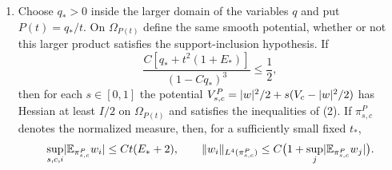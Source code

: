 \begin{theorem}
\begin{enumerate}
\[
 \Var_kF\le2\E_k\abs{\nabla F}^2,\qquad \Ent_k(F^2)\le4\E_k\abs{\nabla F}^2,
\]
and for real or complex $F,G$, with the covariance taken bilinear,
\[
 \abs{\Cov_k(F,G)}\le C\sum_{i,j}e^{-b'\dist(i,j)}\norm{\partial_iF}_2\norm{\partial_jG}_2
\]
for a fixed $b'>0$. The constants do not depend on the dimension, on the radii of the balls, on the side, on the depth, or on the coupling satisfying the conditions of \cref{ch10:thm:common-analytic-class}.
\item Choose $q_*>0$ inside the larger domain of the variables $q$ and put $P(t)=q_*/t$. On $\Omega_{P(t)}$ define the same smooth potential, whether or not this larger product satisfies the support-inclusion hypothesis. If
\[
 \frac{C[q_*+t^2(1+E_*)]}{(1-Cq_*)^3}\le\frac12,
\]
then for each $s\in[0,1]$ the potential $V^P_{s,c}=\lvert w\rvert^2/2+s(V_c-\lvert w\rvert^2/2)$ has Hessian at least $I/2$ on $\Omega_{P(t)}$ and satisfies the inequalities of (2). If $\pi^P_{s,c}$ denotes the normalized measure, then, for a sufficiently small fixed $t_*$,
\[
 \sup_{s,c,i}\lvert \mathbb E_{\pi^P_{s,c}}w_i\rvert\le Ct(E_*+2),\qquad \lVert w_i\rVert_{L^4(\pi^P_{s,c})}\le C\bigl(1+\sup_j\lvert \mathbb E_{\pi^P_{s,c}}w_j\rvert\bigr).
\]
\end{enumerate}
\end{theorem}

